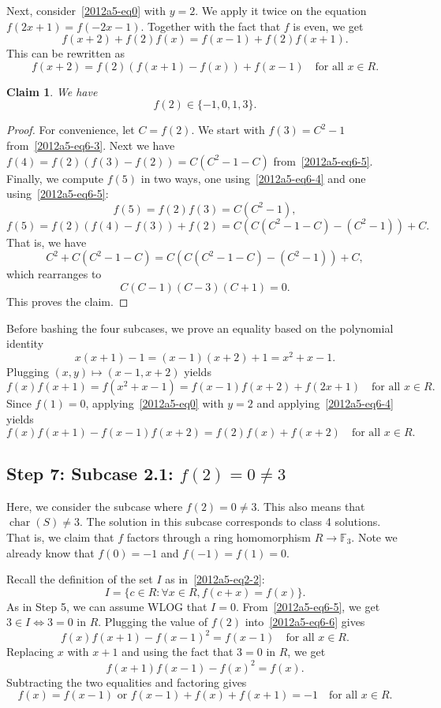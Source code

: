 \documentclass{article}
\newcommand{\F}{\mathbb{F}}
\DeclareMathOperator{\rchar}{char}
\newtheorem*{claim}{Claim}
\begin{document}
Next, consider~\eqref{2012a5-eq0} with $y = 2$.
We apply it twice on the equation $f(2x + 1) = f(-2x - 1)$.
Together with the fact that $f$ is even, we get
\[ f(x + 2) + f(2) f(x) = f(x - 1) + f(2) f(x + 1). \]
This can be rewritten as
\[ f(x + 2) = f(2) (f(x + 1) - f(x)) + f(x - 1) \quad \text{for all } x \in R. \tag{6.5}\label{2012a5-eq6-5} \]

\begin{claim}
We have \[ f(2) \in \{-1, 0, 1, 3\}. \]
\end{claim}
\begin{proof}
For convenience, let $C = f(2)$.
We start with $f(3) = C^2 - 1$ from~\eqref{2012a5-eq6-3}.
Next we have $f(4) = f(2) (f(3) - f(2)) = C (C^2 - 1 - C)$ from~\eqref{2012a5-eq6-5}.
Finally, we compute $f(5)$ in two ways, one using~\eqref{2012a5-eq6-4} and one using~\eqref{2012a5-eq6-5}:
\[ f(5) = f(2) f(3) = C(C^2 - 1), \]
\[ f(5) = f(2) (f(4) - f(3)) + f(2) = C(C(C^2 - 1 - C) - (C^2 - 1)) + C. \]
That is, we have
\[ C^2 + C(C^2 - 1 - C) = C(C(C^2 - 1 - C) - (C^2 - 1)) + C, \]
    which rearranges to
\[ C(C - 1)(C - 3)(C + 1) = 0. \]
This proves the claim.
\end{proof}

Before bashing the four subcases, we prove an equality based on the polynomial identity
\[ x(x + 1) - 1 = (x - 1)(x + 2) + 1 = x^2 + x - 1. \]
Plugging $(x, y) \mapsto (x - 1, x + 2)$ yields
\[ f(x) f(x + 1) = f(x^2 + x - 1) = f(x - 1) f(x + 2) + f(2x + 1) \quad \text{for all } x \in R. \]
Since $f(1) = 0$, applying~\eqref{2012a5-eq0} with $y = 2$ and applying~\eqref{2012a5-eq6-4} yields
\[ f(x) f(x + 1) - f(x - 1) f(x + 2) = f(2) f(x) + f(x + 2) \quad \text{for all } x \in R. \tag{6.6}\label{2012a5-eq6-6} \]









\subsection*{Step 7: Subcase 2.1: $f(2) = 0 \neq 3$}

Here, we consider the subcase where $f(2) = 0 \neq 3$.
This also means that $\rchar(S) \neq 3$.
The solution in this subcase corresponds to class 4 solutions.
That is, we claim that $f$ factors through a ring homomorphism $R \to \F_3$.
Note we already know that $f(0) = -1$ and $f(-1) = f(1) = 0$.

Recall the definition of the set $I$ as in~\eqref{2012a5-eq2-2}:
\[ I = \{c \in R : \forall x \in R, f(c + x) = f(x)\}. \]
As in Step 5, we can assume WLOG that $I = 0$.
From~\eqref{2012a5-eq6-5}, we get $3 \in I \iff 3 = 0$ in $R$.
Plugging the value of $f(2)$ into~\eqref{2012a5-eq6-6} gives
\[ f(x) f(x + 1) - f(x - 1)^2 = f(x - 1) \quad \text{for all } x \in R. \tag{7.1}\label{2012a5-eq7-1} \]
Replacing $x$ with $x + 1$ and using the fact that $3 = 0$ in $R$, we get
\[ f(x + 1) f(x - 1) - f(x)^2 = f(x). \]
Subtracting the two equalities and factoring gives
\[ f(x) = f(x - 1) \text{ or } f(x - 1) + f(x) + f(x + 1) = -1 \quad \text{for all } x \in R. \tag{7.2}\label{2012a5-eq7-2} \]
\end{document}
